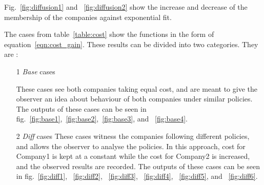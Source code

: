 Fig.~\ref{fig:diffusion1} and ~\ref{fig:diffusion2} show the increase and decrease of the membership of the companies against exponential fit.

The cases from table~\ref{table:cost} show the functions in the form of equation~\ref{eqn:cost_gain}. These results can be divided into two categories. They are :

\begin{enumerate}
\item[1] \emph{Base} cases

These cases see both companies taking equal cost, and are meant to give the observer an idea about behaviour of both companies under similar policies. The outputs of these cases can be seen in fig.~\ref{fig:base1},~\ref{fig:base2},~\ref{fig:base3}, and ~\ref{fig:base4}.

\item[2] \emph{Diff} cases
These cases witness the companies following different policies, and allows the observer to analyse the policies. In this approach, cost for Company1 is kept at a constant while the cost for Company2 is increased, and the observed results are recorded. 
The outputs of these cases can be seen in fig.~\ref{fig:diff1}, ~\ref{fig:diff2}, ~\ref{fig:diff3}, ~\ref{fig:diff4}, ~\ref{fig:diff5}, and ~\ref{fig:diff6}. 

\end{enumerate}

